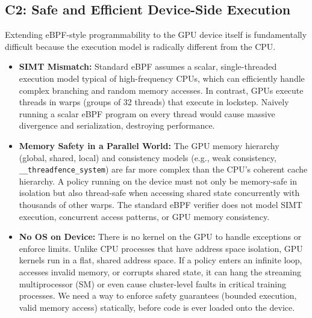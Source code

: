 \subsection{C2: Safe and Efficient Device-Side Execution}
Extending eBPF-style programmability to the GPU device itself is fundamentally difficult because the execution model is radically different from the CPU.
\begin{itemize}[leftmargin=*]
    \item \textbf{SIMT Mismatch:} Standard eBPF assumes a scalar, single-threaded execution model typical of high-frequency CPUs, which can efficiently handle complex branching and random memory accesses. In contrast, GPUs execute threads in warps (groups of 32 threads) that execute in lockstep. Naively running a scalar eBPF program on every thread would cause massive divergence and serialization, destroying performance.
    \item \textbf{Memory Safety in a Parallel World:} The GPU memory hierarchy (global, shared, local) and consistency models (e.g., weak consistency, \texttt{\_\_threadfence\_system}) are far more complex than the CPU's coherent cache hierarchy. A policy running on the device must not only be memory-safe in isolation but also thread-safe when accessing shared state concurrently with thousands of other warps. The standard eBPF verifier does not model SIMT execution, concurrent access patterns, or GPU memory consistency.
    \item \textbf{No OS on Device:} There is no kernel on the GPU to handle exceptions or enforce limits. Unlike CPU processes that have address space isolation, GPU kernels run in a flat, shared address space. If a policy enters an infinite loop, accesses invalid memory, or corrupts shared state, it can hang the streaming multiprocessor (SM) or even cause cluster-level faults in critical training processes. We need a way to enforce safety guarantees (bounded execution, valid memory access) statically, before code is ever loaded onto the device.
\end{itemize}

